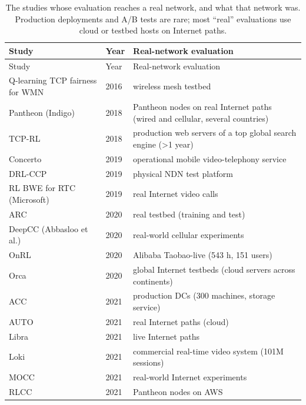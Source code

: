 \begin{small}
\setlength{\tabcolsep}{4pt}
\begin{longtable}{@{}L{4.0cm}lL{8.6cm}@{}}
\caption{The \nLevelRealnetwork{} studies whose evaluation reaches a real network, and what that network was. Production deployments and A/B tests are rare; most ``real'' evaluations use cloud or testbed hosts on Internet paths.}\label{tab:real}\\
\toprule Study & Year & Real-network evaluation \\ \midrule \endfirsthead
\toprule Study & Year & Real-network evaluation \\ \midrule \endhead
\bottomrule \endfoot
Q-learning TCP fairness for WMN~\cite{arianpoo2016how} & 2016 & wireless mesh testbed \\
Pantheon (Indigo)~\cite{yan2018pantheon} & 2018 & Pantheon nodes on real Internet paths (wired and cellular, several countries) \\
TCP-RL~\cite{nie2019tcprl} & 2018 & production web servers of a top global search engine (>1 year) \\
Concerto~\cite{zhou2019concerto} & 2019 & operational mobile video-telephony service \\
DRL-CCP~\cite{lan2019deep} & 2019 & physical NDN test platform \\
RL BWE for RTC (Microsoft)~\cite{fang2019rtc} & 2019 & real Internet video calls \\
ARC~\cite{zhang2020reinforcement} & 2020 & real testbed (training and test) \\
DeepCC (Abbasloo et al.)~\cite{abbasloo2021deepcc} & 2020 & real-world cellular experiments \\
OnRL~\cite{zhang2020onrl} & 2020 & Alibaba Taobao-live (543 h, 151 users) \\
Orca~\cite{abbasloo2020orca} & 2020 & global Internet testbeds (cloud servers across continents) \\
ACC~\cite{yan2021acc} & 2021 & production DCs (300 machines, storage service) \\
AUTO~\cite{li2021auto} & 2021 & real Internet paths (cloud) \\
Libra~\cite{du2025libra} & 2021 & live Internet paths \\
Loki~\cite{zhang2021loki} & 2021 & commercial real-time video system (101M sessions) \\
MOCC~\cite{ma2022mocc} & 2021 & real-world Internet experiments \\
RLCC~\cite{xia2021rlcc} & 2021 & Pantheon nodes on AWS \\

\end{longtable}
\end{small}
